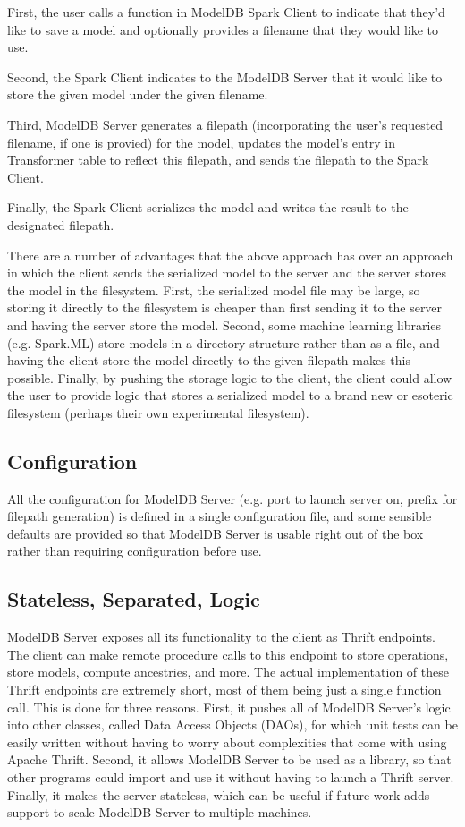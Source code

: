 First, the user calls a function in ModelDB Spark Client to indicate that they'd like to save a model and optionally
provides a filename that they would like to use.

Second, the Spark Client indicates to the ModelDB Server that it would like to store the given model under the
given filename.

Third, ModelDB Server generates a filepath (incorporating the user's requested filename, if one is provied)
for the model, updates the model's entry in Transformer table 
to reflect this filepath, and sends the filepath to the Spark Client.

Finally, the Spark Client serializes the model and writes the result to the designated filepath.

There are a number of advantages that the above approach has over an approach in which the client
sends the serialized model to the server and the server stores the model in the filesystem. First,
the serialized model file may be large, so storing it directly to the filesystem is cheaper than
first sending it to the server and having the server store the model. Second, some machine learning
libraries (e.g. Spark.ML) store models in a directory structure rather than as a file, and having the
client store the model directly to the given filepath makes this possible. Finally, by pushing the storage
logic to the client, the client could allow the user to provide logic that stores a serialized model
to a brand new or esoteric filesystem (perhaps their own experimental filesystem). 

\subsection{Configuration}
All the configuration for ModelDB Server (e.g. port to launch server on, prefix for
filepath generation) is defined in a single configuration file, and some sensible defaults
are provided so that ModelDB Server is usable right out of the box rather than requiring
configuration before use.

\subsection{Stateless, Separated, Logic}
ModelDB Server exposes all its functionality to the client as Thrift endpoints. The client
can make remote procedure calls to this endpoint to store operations, store models, compute 
ancestries, and more. The actual implementation of these Thrift endpoints are extremely short,
most of them being just a single function call. This is done for three reasons. First, it
pushes all of ModelDB Server's logic into other classes, called Data Access Objects (DAOs), 
for which unit tests can be easily written without having to worry about complexities that 
come with using Apache Thrift. Second, it allows ModelDB Server to be used as a library, 
so that other programs could import and use it without having to launch a Thrift server. 
Finally, it makes the server stateless, which can be useful if
future work adds support to scale ModelDB Server to multiple machines.

